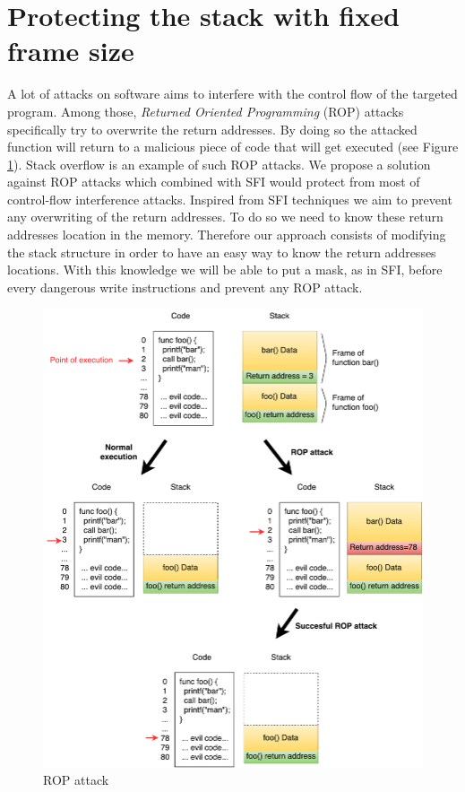 \documentclass[11pt]{sdm}
\begin{document}
\section{Protecting the stack with fixed frame size}
\label{sec:Protecting the stack with fixed frame size}
	A lot of attacks on software aims to interfere with the control flow of the targeted program. Among those, \textit{Returned Oriented Programming} (ROP) attacks specifically try to overwrite the return addresses.
By doing so the attacked function will return to a malicious piece of code that will get executed (see Figure \ref{rop_attack}).
Stack overflow is an example of such ROP attacks.
We propose a solution against ROP attacks which combined with SFI would protect from most of control-flow interference attacks.
Inspired from SFI techniques we aim to prevent any overwriting of the return addresses. To do so we need to know these return addresses location in the memory. Therefore our approach consists of modifying the stack structure in order to have an easy way to know the return addresses locations. With this knowledge we will be able to put a mask, as in SFI, before every dangerous write instructions and prevent any ROP attack.

\begin{figure}
\centering
\includegraphics[scale=0.6]{images/rop_attack.pdf}
\caption{ROP attack}
\label{rop_attack}
\end{figure}
\end{document}
